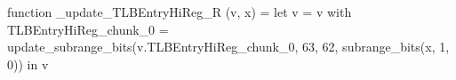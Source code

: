 function _update_TLBEntryHiReg_R (v, x) = let v = { v with TLBEntryHiReg_chunk_0 = update_subrange_bits(v.TLBEntryHiReg_chunk_0, 63, 62, subrange_bits(x, 1, 0)) } in
  v
